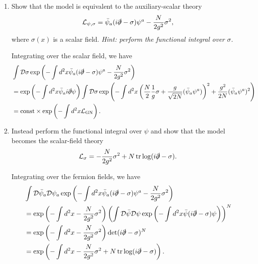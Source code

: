 \begin{enumerate}[label=\alph*)]
    \item Show that the model is equivalent to the auxiliary-scalar theory
    \begin{equation}
        \mathcal{L}_{\psi,\sigma}
        =\bar\psi_a(i\slashed{\partial}-\sigma)\psi^a
        -\frac{N}{2g^2}\sigma^2,
    \end{equation}
    where $\sigma(x)$ is a scalar field.
    \textit{Hint: perform the functional integral over $\sigma$.}
    \begin{solution}
        Integrating over the scalar field, we have
        \begin{equation}
            \begin{aligned}
                &\int \mathcal{D}\sigma\exp\left(- \int d^2x\bar\psi_a(i\slashed{\partial}-\sigma)\psi^a
        -\frac{N}{2g^2}\sigma^2\right)\\
        &=\exp\left(-\int d^2x\bar\psi_ai\slashed{\partial}\psi\right)\int \mathcal{D}\sigma\exp\left(-\int d^2x\left(\frac{N}{2}\frac{1}{g}\sigma + \frac{g}{\sqrt{2N}}(\bar\psi   _a\psi^a)\right)^2 + \frac{g^2}{2N}(\bar\psi   _a\psi^a)^2\right)\\
        &= \mathrm{const} \times \exp\left(-\int d^2x \mathcal{L}_{\mathrm{GN}}\right).
            \end{aligned}
        \end{equation}
    \end{solution}

    \item Instead perform the functional integral over $\psi$ and show that the
    model becomes the scalar-field theory
    \begin{equation}
        \mathcal{L}_\sigma
        =-\frac{N}{2g^2}\sigma^2
        +N\operatorname{tr}\log(i\slashed{\partial}-\sigma).
    \end{equation}
    \begin{solution}
        Integrating over the fermion fields, we have
        \begin{equation}
            \begin{aligned}
                &\int \mathcal{D}\bar \psi_a\mathcal{D}\psi_a \exp\left(- \int d^2x\bar\psi_a(i\slashed{\partial}-\sigma)\psi^a
        -\frac{N}{2g^2}\sigma^2\right)\\
        &=\exp\left(-\int d^2x - \frac{N}{2g^2}\sigma^2\right)\left(\int \mathcal{D}\bar\psi\mathcal{D}\psi\exp\left(- \int d^2x\bar\psi(i\slashed{\partial}-\sigma)\psi
        \right)\right)^N\\
        &=\exp\left(-\int d^2x - \frac{N}{2g^2}\sigma^2\right)\det(i\slashed{\partial}-\sigma)^N\\
        &=\exp\left(-\int d^2x - \frac{N}{2g^2}\sigma^2 +N\operatorname{tr}\log(i\slashed{\partial}-\sigma)\right).
            \end{aligned}
        \end{equation}
    \end{solution}
\end{enumerate}
